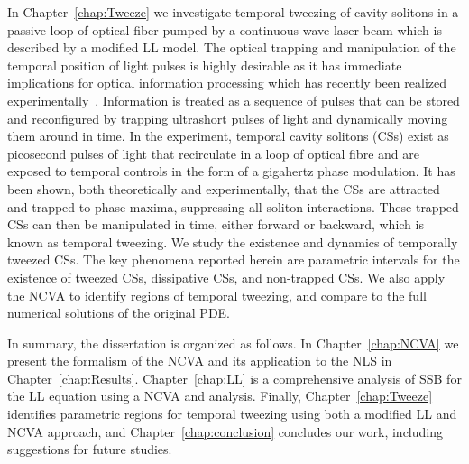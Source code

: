In Chapter~\ref{chap:Tweeze} we investigate temporal tweezing of cavity solitons in a passive loop of optical fiber pumped by a continuous-wave laser beam which is described by a modified LL model.  The optical trapping and manipulation of the temporal position of light pulses is highly desirable as it has immediate implications for optical information processing which has recently been realized experimentally~\cite{tweeze}.  Information is treated as a sequence of pulses that can be stored and reconfigured by trapping ultrashort pulses of light and dynamically moving them around in time.  In the experiment, temporal cavity solitons (CSs) exist as picosecond pulses of light that recirculate in a loop of optical fibre and are exposed to temporal controls in the form of a gigahertz phase modulation.  It has been shown, both theoretically and experimentally, that the CSs are attracted and trapped to phase maxima, suppressing all soliton interactions.  These trapped CSs can then be manipulated in time, either forward or backward, which is known as temporal tweezing.  We study the existence and dynamics of temporally tweezed CSs.  The key phenomena reported herein are parametric intervals for the existence of tweezed CSs, dissipative CSs, and non-trapped CSs.  We also apply the NCVA to identify regions of temporal tweezing, and compare to the full numerical solutions of the original PDE.    
 
In summary, the dissertation is organized as follows.  In Chapter~\ref{chap:NCVA} we present the formalism of the NCVA and its application to the NLS in Chapter~\ref{chap:Results}.  Chapter~\ref{chap:LL} is a comprehensive analysis of SSB for the LL equation using a NCVA and  analysis.  Finally, Chapter~\ref{chap:Tweeze} identifies parametric regions for temporal tweezing using both a modified LL and NCVA approach, and Chapter~\ref{chap:conclusion} concludes our work, including suggestions for future studies.




